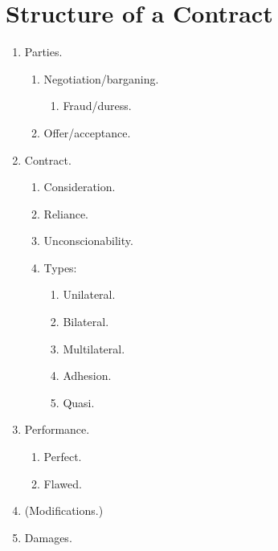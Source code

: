\section{Structure of a Contract}

\begin{enumerate}
    \item Parties.
    \begin{enumerate}
        \item Negotiation/barganing.
        \begin{enumerate}
            \item Fraud/duress.
        \end{enumerate}
        \item Offer/acceptance.
    \end{enumerate}
    \item Contract.
    \begin{enumerate}
        \item Consideration.
        \item Reliance.
        \item Unconscionability.
        \item Types:
        \begin{enumerate}
            \item Unilateral.
            \item Bilateral.
            \item Multilateral.
            \item Adhesion.
            \item Quasi.
        \end{enumerate}
    \end{enumerate}
    \item Performance.
    \begin{enumerate}
        \item Perfect.
        \item Flawed.
    \end{enumerate}
    \item (Modifications.)
    \item Damages.
\end{enumerate}

